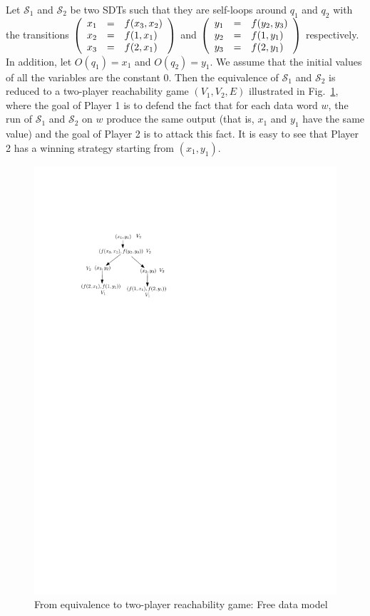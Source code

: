 \documentclass[runningheads,a4paper]{llncs}
\newcommand\Ss{\mathcal{S}}
\begin{document}
Let $\Ss_1$ and $\Ss_2$ be two SDTs such that they are self-loops around $q_1$ and $q_2$ with the transitions 
$\left(\begin{array}{l c l} x_1 &=& f(x_3, x_2) \\ x_2 &=& f(1, x_1) \\ x_3 &=& f(2, x_1) \end{array}\right)$
and
$\left(\begin{array}{l c l} y_1 &=& f(y_2, y_3) \\ y_2 &=& f(1,y_1) \\ y_3 &=& f(2, y_1)\end{array}\right)$
respectively. In addition, let $O(q_1)=x_1$ and $O(q_2)=y_1$. We assume that the initial values of all the variables are the constant $0$. Then the equivalence of $\Ss_1$ and $\Ss_2$ is reduced to a two-player reachability game $(V_1, V_2, E)$ illustrated in Fig.~\ref{fig-equiv-to-game}, where the goal of Player 1 is to defend the fact that for each data word $w$, the run of $\Ss_1$ and $\Ss_2$ on $w$ produce the same output (that is, $x_1$ and $y_1$ have the same value) and the goal of Player 2 is to attack this fact. It is easy to see that Player 2 has a winning strategy starting from $(x_1, y_1)$.
\begin{figure}[h]
\begin{center}
\includegraphics[scale=0.9]{game.pdf}
\end{center}
\caption{From equivalence to two-player reachability game: Free data model}\label{fig-equiv-to-game}
\end{figure}
\end{document}
